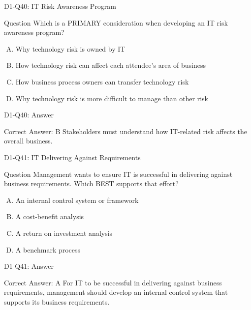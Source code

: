 \documentclass{beamer}
\begin{document}
	\begin{frame}{D1-Q40: IT Risk Awareness Program}
		\begin{block}{Question}
			Which is a PRIMARY consideration when developing an IT risk awareness program?
		\end{block}
		\begin{enumerate}[(A)]
			\item Why technology risk is owned by IT
			\item How technology risk can affect each attendee's area of business
			\item How business process owners can transfer technology risk
			\item Why technology risk is more difficult to manage than other risk
		\end{enumerate}
	\end{frame}
	\begin{frame}{D1-Q40: Answer}
		\begin{block}{Correct Answer: B}
			Stakeholders must understand how IT-related risk affects the overall business.
		\end{block}
	\end{frame}
	
	\begin{frame}{D1-Q41: IT Delivering Against Requirements}
		\begin{block}{Question}
			Management wants to ensure IT is successful in delivering against business requirements. Which BEST supports that effort?
		\end{block}
		\begin{enumerate}[(A)]
			\item An internal control system or framework
			\item A cost-benefit analysis
			\item A return on investment analysis
			\item A benchmark process
		\end{enumerate}
	\end{frame}
	\begin{frame}{D1-Q41: Answer}
		\begin{block}{Correct Answer: A}
			For IT to be successful in delivering against business requirements, management should develop an internal control system that supports its business requirements.
		\end{block}
	\end{frame}
	
\end{document}
